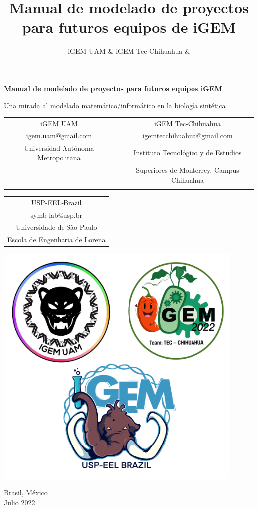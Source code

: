 \documentclass[11pt, letterpaper, spanish]{article}
\title{Manual de modelado de proyectos para futuros equipos de iGEM}
\author{iGEM UAM \&  iGEM Tec-Chihuahua \& }
\begin{document}
\begin{titlepage}
   \begin{center}
       
   {\Huge \textbf{Manual de modelado de proyectos para futuros equipos iGEM}}

       \vspace{0.5cm}
        Una mirada al modelado matemático/informático en la biología sintética
            
       \vspace{1.5 cm}

\centering\begin{tabular}{>{\centering\arraybackslash} c c c}
iGEM UAM &  & iGEM Tec-Chihuahua \\
igem.uam@gmail.com &  & igemtecchihuahua@gmail.com\\
Universidad Autónoma Metropolitana &  & Instituto Tecnológico y de Estudios\\
 &  & Superiores de Monterrey, Campus Chihuahua\\
 &  & \\
 \end{tabular}
 \centering\begin{tabular}{>{\centering\arraybackslash} c}
 USP-EEL-Brazil \\
symb-lab@usp.br \\
Universidade de São Paulo \\
Escola de Engenharia de Lorena \\
\end{tabular}

  \vspace{1.0cm}
        
\includegraphics[width=12cm]{Logos-Chih-UAM-USP.png}

       \vfill
       \vspace{0.8cm}
       Brasil, México\\
       Julio 2022
            
   \end{center}
\end{titlepage}
\end{document}
